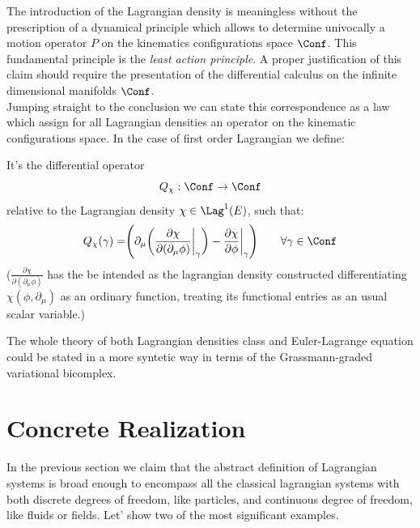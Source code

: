 \documentclass[Main]{subfiles}
\begin{document}
	The introduction of the Lagrangian density is meaningless without the prescription of a dynamical principle which allows to determine univocally a motion operator $P$ on the kinematics configurations space $\Conf$.
	This fundamental principle is the \emph{least action principle}.
	A proper justification of this claim should require the presentation of the differential calculus on the infinite dimensional manifolds $\Conf$. 
	\\
	Jumping straight to the conclusion we can state this correspondence as a law which assign for all Lagrangian densities an operator on the kinematic configurations space. In the case of first order Lagrangian we define:
	\begin{definition}
		It's the differential operator
		\begin{displaymath}
			Q_\chi : \Conf \rightarrow \Conf
		\end{displaymath}
		relative to the Lagrangian density $\chi \in \Lag^1(E)$, such that:
		\begin{equation}
			Q_\chi (\gamma) = \Biggr( \partial_\mu \biggr( \frac{\partial \chi}{\partial(\partial_\mu \phi)} \biggr\vert_\gamma \biggr) - \frac{\partial \chi}{\partial \phi}\biggr\vert_\gamma \Biggr) \qquad \forall \gamma \in \Conf
		\end{equation}
		($\frac{\partial \chi}{\partial(\partial_\mu \phi)}$ has the be intended as the lagrangian density constructed differentiating $\chi(\phi, \partial_\mu)$ as an ordinary function, treating its functional entries as an usual scalar variable.)
	\end{definition}
	
	\begin{observation}
		The whole theory of both Lagrangian densities class and Euler-Lagrange equation could be stated in a more syntetic way in terms of the Grassmann-graded variational bicomplex.\cite{Giachetta2009}\cite{Sardanashvily}
	\end{observation}
	
		

	\section{Concrete Realization}
	In the previous section we claim that the abstract definition of Lagrangian systems is broad enough to encompass all the classical lagrangian systems with both discrete degrees of freedom, like particles, and continuous degree of freedom, like fluids or fields.
	Let' show two of the most significant examples.
	
\end{document}
